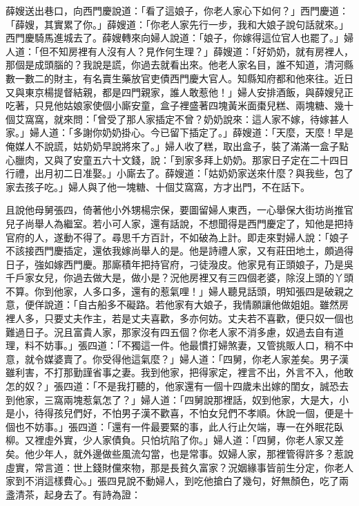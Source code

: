 薛嫂送出巷口，向西門慶說道：「看了這娘子，你老人家心下如何？」西門慶道：「薛嫂，其實累了你。」薛嫂道：「你老人家先行一步，我和大娘子說句話就來。」西門慶騎馬進城去了。薛嫂轉來向婦人說道：「娘子，你嫁得這位官人也罷了。」婦人道：「但不知房裡有人沒有人？見作何生理？」薛嫂道：「好奶奶，就有房裡人，那個是成頭腦的？我說是謊，你過去就看出來。他老人家名目，誰不知道，清河縣數一數二的財主，有名賣生藥放官吏債西門慶大官人。知縣知府都和他來往。近日又與東京楊提督結親，都是四門親家，誰人敢惹他！」婦人安排酒飯，與薛嫂兒正吃著，只見他姑娘家使個小廝安童，盒子裡盛著四塊黃米面棗兒糕、兩塊糖、幾十個艾窩窩，就來問：「曾受了那人家插定不曾？奶奶說來：這人家不嫁，待嫁甚人家。」婦人道：「多謝你奶奶掛心。今已留下插定了。」薛嫂道：「天麼，天麼！早是俺媒人不說謊，姑奶奶早說將來了。」婦人收了糕，取出盒子，裝了滿滿一盒子點心臘肉，又與了安童五六十文錢，說：「到家多拜上奶奶。那家日子定在二十四日行禮，出月初二日准娶。」小廝去了。薛嫂道：「姑奶奶家送來什麼？與我些，包了家去孩子吃。」婦人與了他一塊糖、十個艾窩窩，方才出門，不在話下。

且說他母舅張四，倚著他小外甥楊宗保，要圖留婦人東西，一心舉保大街坊尚推官兒子尚舉人為繼室。若小可人家，還有話說，不想聞得是西門慶定了，知他是把持官府的人，遂動不得了。尋思千方百計，不如破為上計。即走來對婦人說：「娘子不該接西門慶插定，還依我嫁尚舉人的是。他是詩禮人家，又有莊田地土，頗過得日子，強如嫁西門慶。那廝積年把持官府，刁徒潑皮。他家見有正頭娘子，乃是吳千戶家女兒，你過去做大是，做小是？況他房裡又有三四個老婆，除沒上頭的丫頭不算。你到他家，人多口多，還有的惹氣哩！」婦人聽見話頭，明知張四是破親之意，便佯說道：「自古船多不礙路。若他家有大娘子，我情願讓他做姐姐。雖然房裡人多，只要丈夫作主，若是丈夫喜歡，多亦何妨。丈夫若不喜歡，便只奴一個也難過日子。況且富貴人家，那家沒有四五個？你老人家不消多慮，奴過去自有道理，料不妨事。」張四道：「不獨這一件。他最慣打婦煞妻，又管挑販人口，稍不中意，就令媒婆賣了。你受得他這氣麼？」婦人道：「四舅，你老人家差矣。男子漢雖利害，不打那勤謹省事之妻。我到他家，把得家定，裡言不出，外言不入，他敢怎的奴？」張四道：「不是我打聽的，他家還有一個十四歲未出嫁的閨女，誠恐去到他家，三窩兩塊惹氣怎了？」婦人道：「四舅說那裡話，奴到他家，大是大，小是小，待得孩兒們好，不怕男子漢不歡喜，不怕女兒們不孝順。休說一個，便是十個也不妨事。」張四道：「還有一件最要緊的事，此人行止欠端，專一在外眠花臥柳。又裡虛外實，少人家債負。只怕坑陷了你。」婦人道：「四舅，你老人家又差矣。他少年人，就外邊做些風流勾當，也是常事。奴婦人家，那裡管得許多？惹說虛實，常言道：世上錢財儻來物，那是長貧久富家？況姻緣事皆前生分定，你老人家到不消這樣費心。」張四見說不動婦人，到吃他搶白了幾句，好無顏色，吃了兩盞清茶，起身去了。有詩為證：

